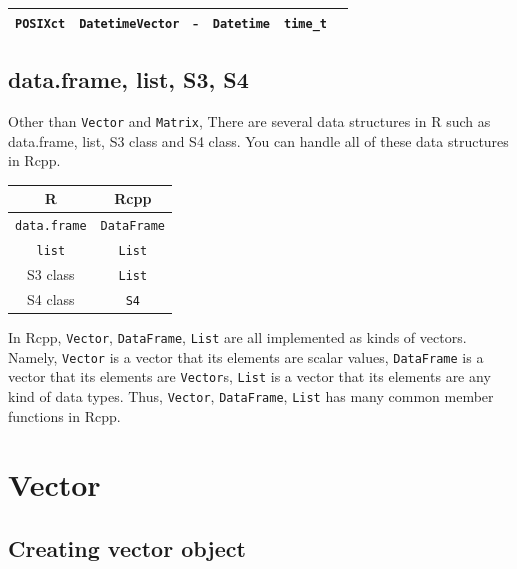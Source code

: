 \documentclass[]{book}
\begin{document}
\begin{longtable}[]{@{}cccccc@{}}
\begin{minipage}[t]{0.14\columnwidth}
\texttt{POSIXct}\strut
\end{minipage} & \begin{minipage}[t]{0.14\columnwidth}\centering
\texttt{DatetimeVector}\strut
\end{minipage} & \begin{minipage}[t]{0.14\columnwidth}\centering
-\strut
\end{minipage} & \begin{minipage}[t]{0.14\columnwidth}\centering
\texttt{Datetime}\strut
\end{minipage} & \begin{minipage}[t]{0.14\columnwidth}\centering
\texttt{time\_t}\strut
\end{minipage}\tabularnewline
\bottomrule
\end{longtable}

\hypertarget{data.frame-list-s3-s4}{%
\section{data.frame, list, S3, S4}\label{data.frame-list-s3-s4}}

Other than \texttt{Vector} and \texttt{Matrix}, There are several data structures in R such as data.frame, list, S3 class and S4 class. You can handle all of these data structures in Rcpp.

\begin{longtable}[]{@{}cc@{}}
\toprule
R & Rcpp\tabularnewline
\midrule
\endhead
\texttt{data.frame} & \texttt{DataFrame}\tabularnewline
\texttt{list} & \texttt{List}\tabularnewline
S3 class & \texttt{List}\tabularnewline
S4 class & \texttt{S4}\tabularnewline
\bottomrule
\end{longtable}

In Rcpp, \texttt{Vector}, \texttt{DataFrame}, \texttt{List} are all implemented as kinds of vectors. Namely, \texttt{Vector} is a vector that its elements are scalar values, \texttt{DataFrame} is a vector that its elements are \texttt{Vector}s, \texttt{List} is a vector that its elements are any kind of data types. Thus, \texttt{Vector}, \texttt{DataFrame}, \texttt{List} has many common member functions in Rcpp.

\hypertarget{vector}{%
\chapter{Vector}\label{vector}}

\hypertarget{creating-vector-object}{%
\section{Creating vector object}\label{creating-vector-object}}
\end{document}
